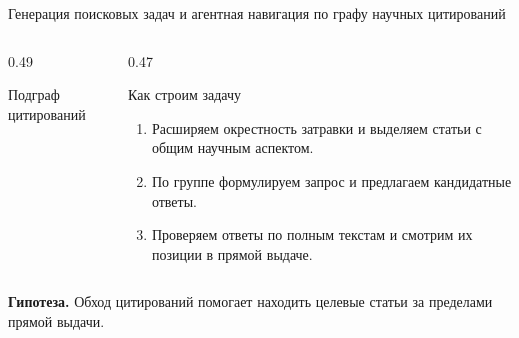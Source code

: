 \documentclass[aspectratio=169]{beamer}
\begin{document}
\begin{frame}{Генерация поисковых задач и агентная навигация по графу научных цитирований}
\begin{columns}[T,onlytextwidth]
\begin{column}{0.49\textwidth}
\begin{block}{Подграф цитирований}
\centering
{}
\end{block}
\end{column}

\begin{column}{0.47\textwidth}
\begin{block}{Как строим задачу}
\small
\begin{enumerate}
  \item Расширяем окрестность затравки и выделяем статьи с общим научным аспектом.
  \item По группе формулируем запрос и предлагаем кандидатные ответы.
  \item Проверяем ответы по полным текстам и смотрим их позиции в прямой выдаче.
\end{enumerate}
\end{block}
\end{column}
\end{columns}

\vspace{2mm}
\begin{alertblock}{}
\small \alert{\textbf{Гипотеза.}} Обход цитирований помогает находить целевые статьи за пределами прямой выдачи.
\end{alertblock}
\end{frame}
\end{document}

